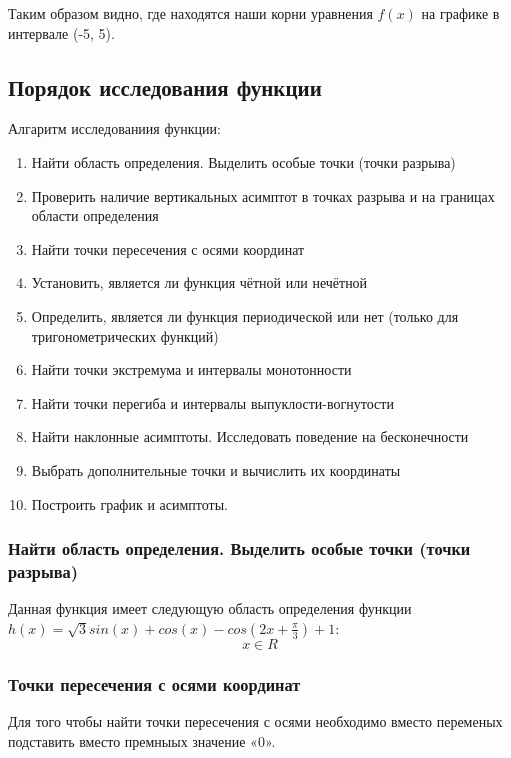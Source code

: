 \documentclass[russian,utf8,nocolumnxxxi,nocolumnxxxii]{eskdtext}
\begin{document}
Таким образом видно, где находятся наши корни уравнения $f(x)$ на графике в интервале (-5, 5).

\subsection{Порядок исследования функции}

Алгаритм исследованиия функции:
\begin{enumerate}
 \item Найти область определения. Выделить особые точки (точки разрыва)
 \item Проверить наличие вертикальных асимптот в точках разрыва и на границах области определения
 \item Найти точки пересечения с осями координат
\item Установить, является ли функция чётной или нечётной
\item Определить, является ли функция периодической или нет (только для тригонометрических функций)
\item Найти точки экстремума и интервалы монотонности
\item Найти точки перегиба и интервалы выпуклости-вогнутости
\item Найти наклонные асимптоты. Исследовать поведение на бесконечности
\item Выбрать дополнительные точки и вычислить их координаты
\item Построить график и асимптоты.
\end{enumerate}

\subsubsection{Найти область определения. Выделить особые точки (точки разрыва)}

Данная функция имеет следующую область определения функции $ h(x)=\sqrt{3} sin(x)+cos(x)-cos(2x+\frac{\pi}{3})+1$: 
$$x\in R$$


\subsubsection{Точки пересечения с осями координат}

Для того чтобы найти точки пересечения с осями необходимо вместо переменых подставить вместо премныых значение «0».
\end{document}

